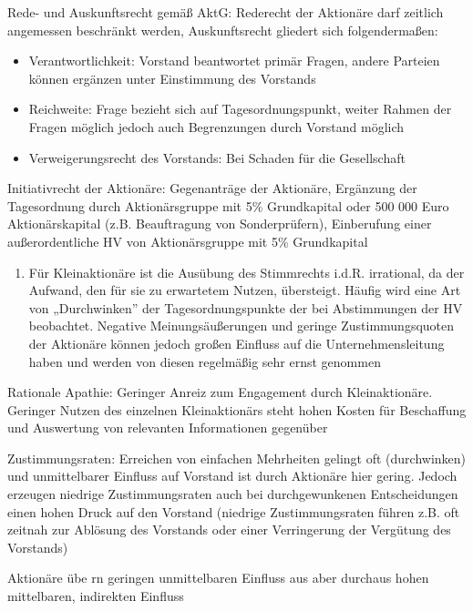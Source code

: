 \documentclass[
]{article}
\providecommand{\tightlist}{%
  \setlength{\itemsep}{0pt}\setlength{\parskip}{0pt}}
\begin{document}
Rede- und Auskunftsrecht gemäß AktG: Rederecht der Aktionäre darf
zeitlich angemessen beschränkt werden, Auskunftsrecht gliedert sich
folgendermaßen:

\begin{itemize}
\tightlist
\item
  Verantwortlichkeit: Vorstand beantwortet primär Fragen, andere
  Parteien können ergänzen unter Einstimmung des Vorstands
\item
  Reichweite: Frage bezieht sich auf Tagesordnungspunkt, weiter Rahmen
  der Fragen möglich jedoch auch Begrenzungen durch Vorstand möglich
\item
  Verweigerungsrecht des Vorstands: Bei Schaden für die Gesellschaft
\end{itemize}

Initiativrecht der Aktionäre: Gegenanträge der Aktionäre, Ergänzung der
Tagesordnung durch Aktionärsgruppe mit 5\% Grundkapital oder 500 000
Euro Aktionärskapital (z.B. Beauftragung von Sonderprüfern), Einberufung
einer außerordentliche HV von Aktionärsgruppe mit 5\% Grundkapital

\begin{enumerate}
\def\labelenumi{\arabic{enumi}.}
\tightlist
\item
  Für Kleinaktionäre ist die Ausübung des Stimmrechts i.d.R. irrational,
  da der Aufwand, den für sie zu erwartetem Nutzen, übersteigt. Häufig
  wird eine Art von „Durchwinken'' der Tagesordnungspunkte der bei
  Abstimmungen der HV beobachtet. Negative Meinungsäußerungen und
  geringe Zustimmungsquoten der Aktionäre können jedoch großen Einfluss
  auf die Unternehmensleitung haben und werden von diesen regelmäßig
  sehr ernst genommen
\end{enumerate}

Rationale Apathie: Geringer Anreiz zum Engagement durch Kleinaktionäre.
Geringer Nutzen des einzelnen Kleinaktionärs steht hohen Kosten für
Beschaffung und Auswertung von relevanten Informationen gegenüber

Zustimmungsraten: Erreichen von einfachen Mehrheiten gelingt oft
(durchwinken) und unmittelbarer Einfluss auf Vorstand ist durch
Aktionäre hier gering. Jedoch erzeugen niedrige Zustimmungsraten auch
bei durchgewunkenen Entscheidungen einen hohen Druck auf den Vorstand
(niedrige Zustimmungsraten führen z.B. oft zeitnah zur Ablösung des
Vorstands oder einer Verringerung der Vergütung des Vorstands)

Aktionäre übe rn geringen unmittelbaren Einfluss aus aber durchaus hohen
mittelbaren, indirekten Einfluss
\end{document}
